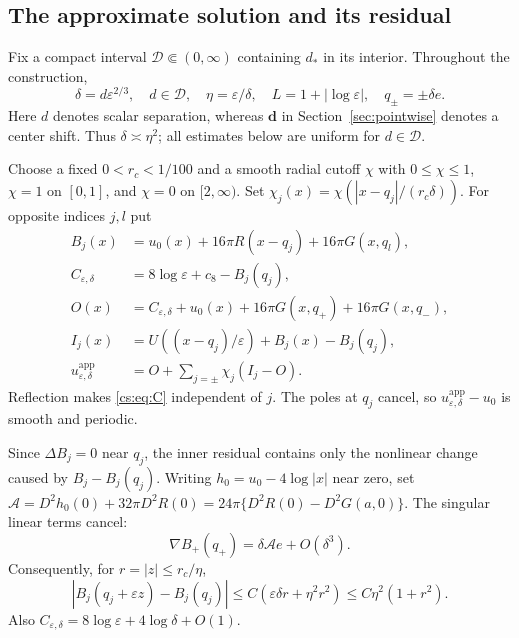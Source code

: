 \documentclass[11pt,reqno]{amsart}
\numberwithin{equation}{section}
\theoremstyle{definition}
\theoremstyle{remark}
\newcommand{\eps}{\varepsilon}
\newcommand{\calA}{\mathcal A}
\begin{document}
\subsection{The approximate solution and its residual}

Fix a compact interval $\mathcal D\Subset(0,\infty)$ containing $d_*$ in its
interior. Throughout the construction,
\begin{equation}\label{cs:eq:parameters}
 \delta=d\eps^{2/3},\quad d\in\mathcal D,\quad
 \eta=\eps/\delta,\quad L=1+|\log\eps|,\quad q_\pm=\pm\delta e.
\end{equation}
Here $d$ denotes scalar separation, whereas $\mathbf d$ in
Section~\ref{sec:pointwise} denotes a center shift.
Thus $\delta\asymp\eta^2$; all estimates below are uniform for $d\in\mathcal D$.

Choose a fixed $0<r_c<1/100$ and a smooth radial cutoff $\chi$ with
$0\le\chi\le1$, $\chi=1$ on $[0,1]$, and $\chi=0$ on $[2,\infty)$.
Set $\chi_j(x)=\chi(|x-q_j|/(r_c\delta))$. For opposite indices $j,l$ put
\begin{align}
 B_j(x)&=u_0(x)+16\pi R(x-q_j)+16\pi G(x,q_l),\label{cs:eq:B}\\
 C_{\eps,\delta}&=8\log\eps+c_8-B_j(q_j),\label{cs:eq:C}\\
 O(x)&=C_{\eps,\delta}+u_0(x)+16\pi G(x,q_+)+16\pi G(x,q_-),\label{cs:eq:outer}\\
 I_j(x)&=U((x-q_j)/\eps)+B_j(x)-B_j(q_j),\label{cs:eq:inner}\\
 u^{\mathrm{app}}_{\eps,\delta}&=O+\sum_{j=\pm}\chi_j(I_j-O).\label{cs:eq:app}
\end{align}
Reflection makes \eqref{cs:eq:C} independent of $j$.
The poles at $q_j$ cancel, so $u^{\mathrm{app}}_{\eps,\delta}-u_0$ is smooth and periodic.

Since $\Delta B_j=0$ near $q_j$, the inner residual contains only the
nonlinear change caused by $B_j-B_j(q_j)$. Writing $h_0=u_0-4\log|x|$
near zero, set
\(\calA=D^2h_0(0)+32\pi D^2R(0) =24\pi\{D^2R(0)-D^2G(a,0)\}.\)
The singular linear terms cancel:
\begin{equation}\label{cs:eq:Bgradient}
 \nabla B_+(q_+)=\delta\calA e+O(\delta^3).
\end{equation}
Consequently, for $r=|z|\le r_c/\eta$,
\begin{equation}\label{cs:eq:Bbound}
 |B_j(q_j+\eps z)-B_j(q_j)|
       \le C(\eps\delta r+\eta^2r^2)
       \le C\eta^2(1+r^2).
\end{equation}
Also $C_{\eps,\delta}=8\log\eps+4\log\delta+O(1)$.
\end{document}
